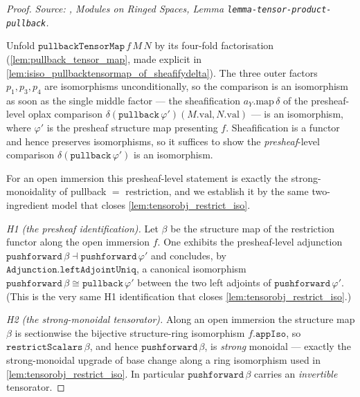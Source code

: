 \begin{proof}
  \leanok
  \textit{Source: \cite{stacks-project}, Modules on Ringed Spaces, Lemma
  \texttt{lemma-tensor-product-pullback}.}

  Unfold \(\mathtt{pullbackTensorMap}\,f\,M\,N\) by its four-fold factorisation
  (\cref{lem:pullback_tensor_map}, made explicit in
  \cref{lem:isiso_pullbacktensormap_of_sheafifydelta}). The three outer factors
  \(p_1, p_3, p_4\) are isomorphisms unconditionally, so the comparison is an isomorphism as
  soon as the single middle factor --- the sheafification \(a_Y.\mathrm{map}\,\delta\) of the
  presheaf-level oplax comparison
  \(\delta(\mathtt{pullback}\,\varphi')(M.\mathrm{val}, N.\mathrm{val})\) --- is an
  isomorphism, where \(\varphi'\) is the presheaf structure map presenting \(f\).
  Sheafification is a functor and hence preserves isomorphisms, so it suffices to show the
  \emph{presheaf}-level comparison \(\delta(\mathtt{pullback}\,\varphi')\) is an isomorphism.

  For an open immersion this presheaf-level statement is exactly the strong-monoidality of
  pullback \(=\) restriction, and we establish it by the same two-ingredient model that
  closes \cref{lem:tensorobj_restrict_iso}.

  \emph{H1 (the presheaf identification).} Let \(\beta\) be the structure map of the
  restriction functor along the open immersion \(f\). One exhibits the presheaf-level
  adjunction \(\mathtt{pushforward}\,\beta \dashv \mathtt{pushforward}\,\varphi'\) and
  concludes, by \(\mathtt{Adjunction.leftAdjointUniq}\), a canonical isomorphism
  \(\mathtt{pushforward}\,\beta \cong \mathtt{pullback}\,\varphi'\) between the two left
  adjoints of \(\mathtt{pushforward}\,\varphi'\). (This is the very same H1 identification
  that closes \cref{lem:tensorobj_restrict_iso}.)

  \emph{H2 (the strong-monoidal tensorator).} Along an open immersion the structure map
  \(\beta\) is sectionwise the bijective structure-ring isomorphism \(f.\mathtt{appIso}\), so
  \(\mathtt{restrictScalars}\,\beta\), and hence \(\mathtt{pushforward}\,\beta\), is
  \emph{strong} monoidal --- exactly the strong-monoidal upgrade of base change along a ring
  isomorphism used in \cref{lem:tensorobj_restrict_iso}. In particular
  \(\mathtt{pushforward}\,\beta\) carries an \emph{invertible} tensorator.


\end{proof}
